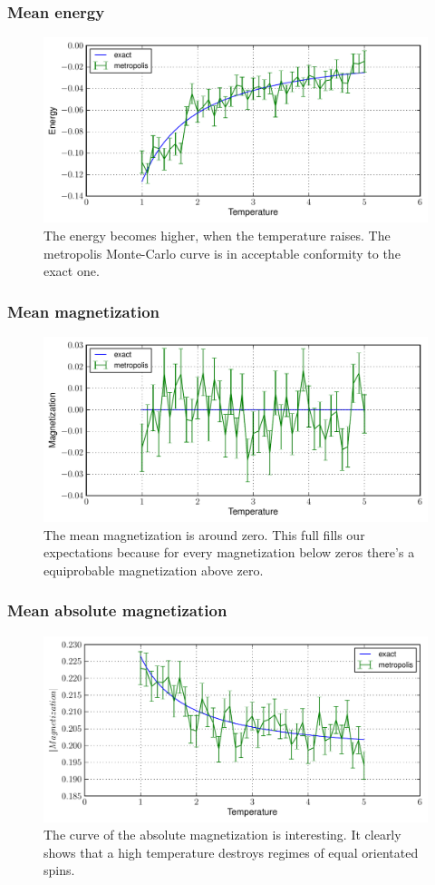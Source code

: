 \documentclass[12pt,a4paper]{scrartcl}
\begin{document}
\subsubsection{Mean energy}
\begin{figure}[H]
\includegraphics[width=14.0cm]{../plots/Mean_energy.pdf}
\caption{The energy becomes higher, when the temperature raises. The metropolis Monte-Carlo curve is in acceptable conformity to the exact one.}
\end{figure}

\subsubsection{Mean magnetization}
\begin{figure}[H]
\includegraphics[width=14.0cm]{../plots/Mean_magnetization.pdf}
\caption{The mean magnetization is around zero. This full fills our expectations because for every magnetization below zeros there's a equiprobable  magnetization above zero.}
\end{figure}

\subsubsection{Mean absolute magnetization}
\begin{figure}[H]
\includegraphics[width=14.0cm]{../plots/Mean_absolute_magnetization.pdf}
\caption{The curve of the absolute magnetization is interesting. It clearly shows that a high temperature destroys regimes of equal orientated spins.} 
\end{figure}
\end{document}
